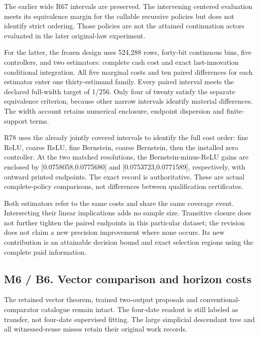 \documentclass[ecta,nameyear,draft]{econsocart}
\begin{document}
The earlier wide R67 intervals are preserved. The intervening centered
evaluation meets its equivalence margin for the callable recursive
policies but does not identify strict ordering. Those policies are not
the attained continuation actors evaluated in the later original-law
experiment.

For the latter, the frozen design uses 524,288 rows, forty-bit
continuous bins, five controllers, and two estimators: complete cash
cost and exact last-innovation conditional integration. All five
marginal costs and ten paired differences for each estimator enter one
thirty-estimand family. Every paired interval meets the declared
full-width target of 1/256. Only four of twenty satisfy the separate
equivalence criterion, because other narrow intervals identify material
differences. The width account retains numerical enclosure, endpoint
dispersion and finite-support terms.

R78 uses the already jointly covered intervals to identify the full cost
order: fine ReLU, coarse ReLU, fine Bernstein, coarse Bernstein, then
the installed zero controller. At the two matched resolutions, the
Bernstein-minus-ReLU gains are enclosed by {[}0.0758058,0.0775680{]} and
{[}0.0753723,0.0771589{]}, respectively, with outward printed endpoints.
The exact record is authoritative. These are actual complete-policy
comparisons, not differences between qualification certificates.

Both estimators refer to the same costs and share the same coverage
event. Intersecting their linear implications adds no sample size.
Transitive closure does not further tighten the paired endpoints in this
particular dataset; the revision does not claim a new precision
improvement where none occurs. Its new contribution is an attainable
decision bound and exact selection regions using the complete paid
information.

\hypertarget{m6-b6.-vector-comparison-and-horizon-costs}{%
\subsection{M6 / B6. Vector comparison and horizon
costs}\label{m6-b6.-vector-comparison-and-horizon-costs}}

The retained vector theorem, trained two-output proposals and
conventional-comparator catalogue remain intact. The four-date readout
is still labeled as transfer, not four-date supervised fitting. The
large simplicial descendant tree and all witnessed-reuse misses retain
their original work records.
\end{document}
